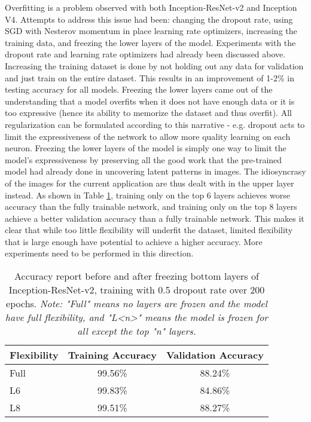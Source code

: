\documentclass[a4paper]{article}
\begin{document}
Overfitting is a problem observed with both Inception-ResNet-v2 and Inception V4. Attempts to address this issue had been: changing the dropout rate, using SGD with Nesterov momentum in place learning rate optimizers, increasing the training data, and freezing the lower layers of the model. Experiments with the dropout rate and learning rate optimizers had already been discussed above. Increasing the training dataset is done by not holding out any data for validation and just train on the entire dataset. This results in an improvement of 1-2\% in testing accuracy for all models. Freezing the lower layers came out of the understanding that a model overfits when it does not have enough data or it is too expressive (hence its ability to memorize the dataset and thus overfit). All regularization can be formulated according to this narrative - e.g. dropout acts to limit the expressiveness of the network to allow more quality learning on each neuron. Freezing the lower layers of the model is simply one way to limit the model's expressiveness by preserving all the good work that the pre-trained model had already done in uncovering latent patterns in images. The idiosyncrasy of the images for the current application are thus dealt with in the upper layer instead. As shown in Table \ref{tab:freeze_layers}, training only on the top 6 layers achieves worse accuracy than the fully trainable network, and training only on the top 8 layers achieve a better validation accuracy than a fully trainable network. This makes it clear that while too little flexibility will underfit the dataset, limited flexibility that is large enough have potential to achieve a higher accuracy. More experiments need to be performed in this direction.

\begin{table}
\centering
\begin{tabular}{l|c|c}
Flexibility & Training Accuracy & Validation Accuracy \\\hline
Full & 99.56\% & 88.24\% \\
L6 & 99.83\% & 84.86\% \\
L8 & 99.51\% & 88.27\% \\
\end{tabular}
\caption{\label{tab:freeze_layers}Accuracy report before and after freezing bottom layers of Inception-ResNet-v2, training with 0.5 dropout rate over 200 epochs. \textit{Note: "Full" means no layers are frozen and the model have full flexibility, and "L<n>" means the model is frozen for all except the top "n" layers.}}
\end{table}
\end{document}
